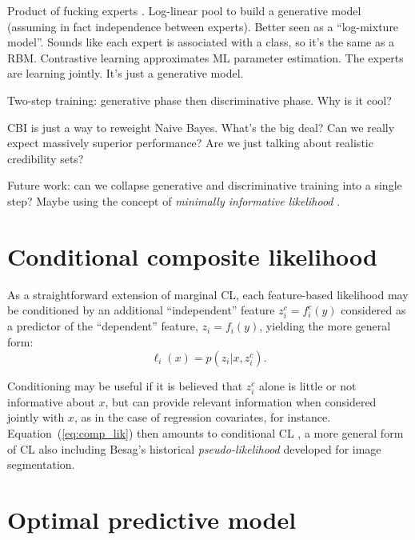 \documentclass[english]{scrartcl}
\begin{document}

{\color{red}Product of fucking experts \cite{Hinton-02}. Log-linear pool to build a generative model (assuming in fact independence between experts). Better seen as a ``log-mixture model''. Sounds like each expert is associated with a class, so it's the same as a RBM. Contrastive learning approximates ML parameter estimation. The experts are learning jointly. It's just a generative model.}

{\color{red}Two-step training: generative phase then discriminative phase. Why is it cool?}

{\color{red}CBI is just a way to reweight Naive Bayes. What's the big deal? Can we really expect massively superior performance? Are we just talking about realistic credibility sets?}

Future work: can we collapse generative and discriminative training into a single step? Maybe using the concept of {\em minimally informative likelihood} \cite{Yuan-99b}.


\appendix

\section{Conditional composite likelihood}
\label{appendix:conditional}

As a straightforward  extension of marginal CL, each feature-based likelihood may be conditioned by an additional ``independent'' feature $z^c_i = f^c_i(y)$ considered as a predictor of the ``dependent'' feature, $z_i=f_i(y)$, yielding the more general form:
\begin{equation}
\label{eq:cond_feat_lik}
\ell_i(x) = p(z_i|x,z^c_i).
\end{equation}

Conditioning may be useful if it is believed that $z^c_i$ alone is little or not informative about $x$, but can provide relevant information when considered jointly with $x$, as in the case of regression covariates, for instance. Equation~(\ref{eq:comp_lik}) then amounts to conditional CL \cite{Varin-11}, a more general form of CL also including Besag's historical {\em pseudo-likelihood} \cite{Besag-74} developed for image segmentation.


\section{Optimal predictive model}
\label{appendix:maxent}
\end{document}
